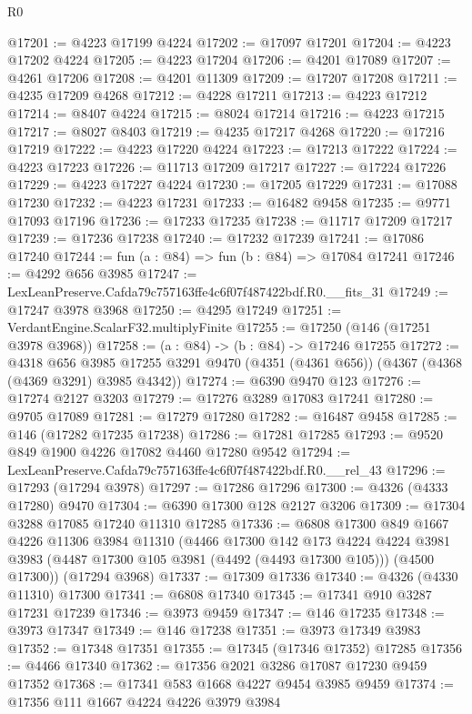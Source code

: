\begin{lexlean}{R0}
\begin{coremodule}
@17201 := @4223 @17199 @4224
@17202 := @17097 @17201
@17204 := @4223 @17202 @4224
@17205 := @4223 @17204
@17206 := @4201 @17089
@17207 := @4261 @17206
@17208 := @4201 @11309
@17209 := @17207 @17208
@17211 := @4235 @17209 @4268
@17212 := @4228 @17211
@17213 := @4223 @17212
@17214 := @8407 @4224
@17215 := @8024 @17214
@17216 := @4223 @17215
@17217 := @8027 @8403
@17219 := @4235 @17217 @4268
@17220 := @17216 @17219
@17222 := @4223 @17220 @4224
@17223 := @17213 @17222
@17224 := @4223 @17223
@17226 := @11713 @17209 @17217
@17227 := @17224 @17226
@17229 := @4223 @17227 @4224
@17230 := @17205 @17229
@17231 := @17088 @17230
@17232 := @4223 @17231
@17233 := @16482 @9458
@17235 := @9771 @17093 @17196
@17236 := @17233 @17235
@17238 := @11717 @17209 @17217
@17239 := @17236 @17238
@17240 := @17232 @17239
@17241 := @17086 @17240
@17244 := fun (a : @84) => fun (b : @84) => @17084 @17241
@17246 := @4292 @656 @3985
@17247 := LexLeanPreserve.Cafda79c757163ffe4c6f07f487422bdf.R0.__fits_31
@17249 := @17247 @3978 @3968
@17250 := @4295 @17249
@17251 := VerdantEngine.ScalarF32.multiplyFinite
@17255 := @17250 (@146 (@17251 @3978 @3968))
@17258 := (a : @84) -> (b : @84) -> @17246 @17255
@17272 := @4318
    @656
    @3985
    @17255
    @3291
    @9470
    (@4351 (@4361 @656))
    (@4367 (@4368 (@4369 @3291) @3985 @4342))
@17274 := @6390 @9470 @123
@17276 := @17274 @2127 @3203
@17279 := @17276 @3289 @17083 @17241
@17280 := @9705 @17089
@17281 := @17279 @17280
@17282 := @16487 @9458
@17285 := @146 (@17282 @17235 @17238)
@17286 := @17281 @17285
@17293 := @9520 @849 @1900 @4226 @17082 @4460 @17280 @9542
@17294 := LexLeanPreserve.Cafda79c757163ffe4c6f07f487422bdf.R0.__rel_43
@17296 := @17293 (@17294 @3978)
@17297 := @17286 @17296
@17300 := @4326 (@4333 @17280) @9470
@17304 := @6390 @17300 @128 @2127 @3206
@17309 := @17304 @3288 @17085 @17240 @11310 @17285
@17336 := @6808
    @17300
    @849
    @1667
    @4226
    @11306
    @3984
    @11310
    (@4466
      @17300
      @142
      @173
      @4224
      @4224
      @3981
      @3983
      (@4487 @17300 @105 @3981 (@4492 (@4493 @17300 @105)))
      (@4500 @17300))
    (@17294 @3968)
@17337 := @17309 @17336
@17340 := @4326 (@4330 @11310) @17300
@17341 := @6808 @17340
@17345 := @17341 @910 @3287 @17231 @17239
@17346 := @3973 @9459
@17347 := @146 @17235
@17348 := @3973 @17347
@17349 := @146 @17238
@17351 := @3973 @17349 @3983
@17352 := @17348 @17351
@17355 := @17345 (@17346 @17352) @17285
@17356 := @4466 @17340
@17362 := @17356 @2021 @3286 @17087 @17230 @9459 @17352
@17368 := @17341 @583 @1668 @4227 @9454 @3985 @9459
@17374 := @17356 @111 @1667 @4224 @4226 @3979 @3984

\end{coremodule}
\end{lexlean}
